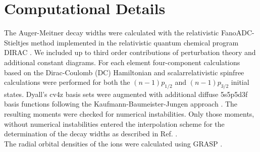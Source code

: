 \section{Computational Details}
\label{section:computational}
The Auger-Meitner
decay widths were calculated with the relativistic FanoADC-Stieltjes
method
implemented in the relativistic quantum chemical program DIRAC \cite{DIRAC17}.
We included up to third order contributions of perturbation theory and additional
constant diagrams.
For each element four-component calculations based on the
Dirac-Coulomb (DC) Hamiltonian
and scalarrelativistic spinfree calculations were
performed for both the $(n-1)p_{1/2}$ and $(n-1)p_{3/2}$ initial states.
Dyall's cv4z basis sets \cite{Dyall4s-7s09} were augmented with additional diffuse
5s5p5d3f
basis functions following the Kaufmann-Baumeister-Jungen approach
\cite{Kaufmann89}.
The resulting moments were checked for numerical instabilities.
Only those moments, without numerical instabilities entered the interpolation
scheme for the determination of the decay widths
{as described in Ref. \cite{Fasshauer15_1}}.\\
The radial orbital densities of the ions were calculated using GRASP
\cite{Dyall89,Parpia96}.
